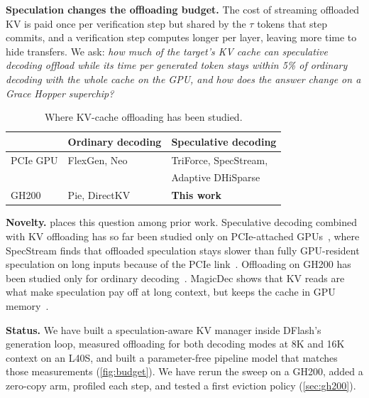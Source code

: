 \documentclass{article}
\begin{document}
\textbf{Speculation changes the offloading budget.} The cost of streaming offloaded KV is paid once per verification step but shared by the $\tau$ tokens that step commits, and a verification step computes longer per layer, leaving more time to hide transfers. We ask: \emph{how much of the target's KV cache can speculative decoding offload while its time per generated token stays within 5\% of ordinary decoding with the whole cache on the GPU, and how does the answer change on a Grace Hopper superchip?}

\begin{table}[t]
\caption{Where KV-cache offloading has been studied.}
\label{tab:gap}
\vskip 0.1in
\begin{center}
\begin{small}
\begin{tabular}{@{}lll@{}}
\toprule
 & Ordinary decoding & Speculative decoding \\
\midrule
PCIe GPU & FlexGen, Neo & TriForce, SpecStream, \\
         &              & Adaptive DHiSparse \\
GH200    & Pie, DirectKV & \textbf{This work} \\
\bottomrule
\end{tabular}
\end{small}
\end{center}
\vskip -0.1in
\end{table}

\textbf{Novelty.}  places this question among prior work. Speculative decoding combined with KV offloading has so far been studied only on PCIe-attached GPUs~\citep{sun2024triforce,li2026specstream,alazhar2026dhisparse}, where SpecStream finds that offloaded speculation stays slower than fully GPU-resident speculation on long inputs because of the PCIe link~\citep{li2026specstream}. Offloading on GH200 has been studied only for ordinary decoding~\citep{xu2024pie,luo2026directkv}. MagicDec shows that KV reads are what make speculation pay off at long context, but keeps the cache in GPU memory~\citep{sadhukhan2025magicdec}.

\textbf{Status.} We have built a speculation-aware KV manager inside DFlash's generation loop, measured offloading for both decoding modes at 8K and 16K context on an L40S, and built a parameter-free pipeline model that matches those measurements (\cref{fig:budget}). We have rerun the sweep on a GH200, added a zero-copy arm, profiled each step, and tested a first eviction policy (\cref{sec:gh200}).
\end{document}
